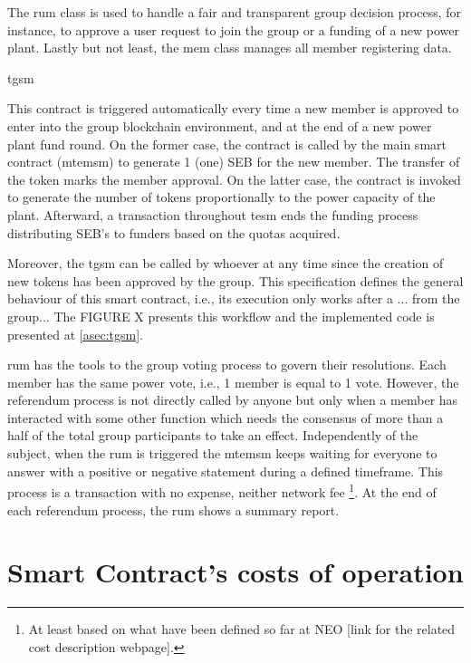 The \gls{rum} class is used to handle a fair and transparent group decision process, for instance, to approve a user request to join the group or a funding of a new power plant.
Lastly but not least, the \gls{mem} class manages all member registering data.

\acrfull{tgsm}

This contract is triggered automatically every time a new member is approved to enter into the group blockchain environment, and at the end of a new power plant fund round.
On the former case, the contract is called by the main smart contract (\gls{mtemsm}) to generate 1 (one) SEB for the new member.
The transfer of the token marks the member approval.
On the latter case, the contract is invoked to generate the number of tokens proportionally to the power capacity of the plant.
Afterward, a transaction throughout \gls{tesm} ends the funding process distributing SEB's to funders based on the quotas acquired.

Moreover, the \gls{tgsm} can be called by whoever at any time since the creation of new tokens has been approved by the group.
This specification defines the general behaviour of this smart contract, i.e., its execution only works after a ... from the group...
The FIGURE X presents this workflow and the implemented code is presented at \autoref{asec:tgsm}.

\hline

\gls{rum} has the tools to the group voting process to govern their resolutions.
Each member has the same power vote, i.e., 1 member is equal to 1 vote.
However, the referendum process is not directly called by anyone but only when a member has interacted with some other function which needs the consensus of more than a half of the total group participants to take an effect.
Independently of the subject, when the \gls{rum} is triggered the \gls{mtemsm} keeps waiting for everyone to answer with a positive or negative statement during a defined timeframe.
This process is a transaction with no expense, neither network fee%
\footnote{At least based on what have been defined so far at NEO [link for the related cost description webpage].}.
At the end of each referendum process, the \gls{rum} shows a summary report.

\section{Smart Contract's costs of operation}


